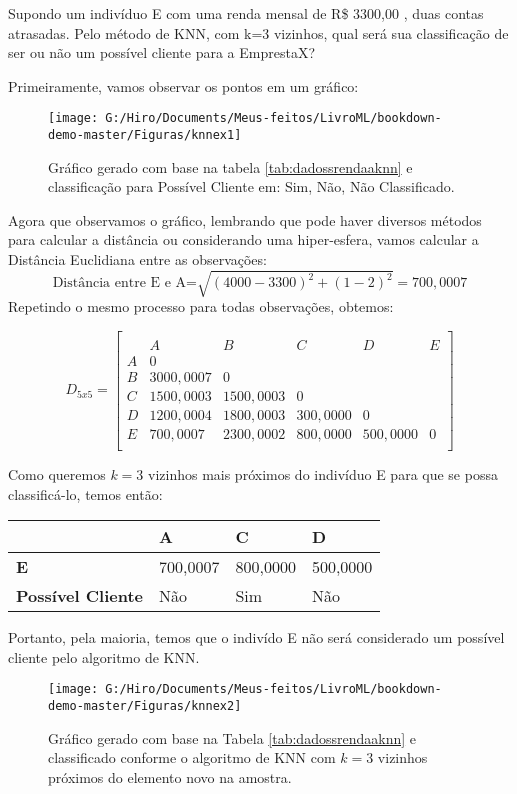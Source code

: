 \documentclass[
  openany]{book}
\begin{document}
Supondo um indivíduo E com uma renda mensal de R\$ 3300,00 , duas contas atrasadas. Pelo método de KNN, com k=3 vizinhos, qual será sua classificação de ser ou não um possível cliente para a EmprestaX?

Primeiramente, vamos observar os pontos em um gráfico:

\begin{figure}

{\centering \texttt{[image: G:/Hiro/Documents/Meus-feitos/LivroML/bookdown-demo-master/Figuras/knnex1]} 

}

\caption{Gráfico gerado com base na tabela \ref{tab:dadossrendaaknn} e classificação para Possível Cliente em: Sim, Não, Não Classificado.}\label{fig:knnex1}
\end{figure}



Agora que observamos o gráfico, lembrando que pode haver diversos métodos para calcular a distância ou considerando uma hiper-esfera, vamos calcular a Distância Euclidiana entre as observações:
\[\mbox{Distância entre E e A=}\sqrt{(4000-3300)^2+(1-2)^2}=700,0007\]
Repetindo o mesmo processo para todas observações, obtemos:

\[D_{5x5}=\begin{bmatrix}\\
 &A&B&C&D&E \\
 A&0&&&&\\
 B&3000,0007&0&&&\\
 C & 1500,0003& 1500,0003&0&&\\
 D& 1200,0004& 1800,0003& 300,0000&0&\\
 E& 700,0007& 2300,0002& 800,0000& 500,0000&0\\
\end{bmatrix}\]

Como queremos \(k=3\) vizinhos mais próximos do indivíduo E para que se possa classificá-lo, temos então:

\begin{longtable}[]{@{}llll@{}}
\toprule
& \textbf{A} & \textbf{C} & \textbf{D}\tabularnewline
\midrule
\endhead
\textbf{E} & 700,0007 & 800,0000 & 500,0000\tabularnewline
\textbf{Possível Cliente} & Não & Sim & Não\tabularnewline
\bottomrule
\end{longtable}

Portanto, pela maioria, temos que o indivído E não será considerado um possível cliente pelo algoritmo de KNN.

\begin{figure}

{\centering \texttt{[image: G:/Hiro/Documents/Meus-feitos/LivroML/bookdown-demo-master/Figuras/knnex2]} 

}

\caption{Gráfico gerado com base na Tabela \ref{tab:dadossrendaaknn} e classificado conforme o algoritmo de KNN com \(k=3\) vizinhos próximos do elemento novo na amostra.}\label{fig:knnex2}
\end{figure}
\end{document}
